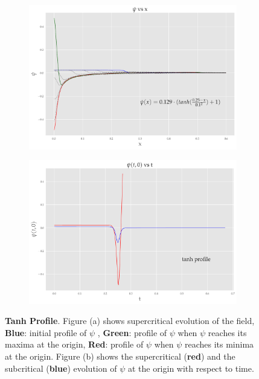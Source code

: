 \begin{figure}
    \centering
    \begin{subfigure}[b]{0.85\textwidth}
        \includegraphics[width=1\linewidth]{images/super_tanh.pdf}
        \caption{}
        \label{fig:tanh}
    \end{subfigure}

    \begin{subfigure}[b]{0.85\textwidth}
        \includegraphics[width=1\linewidth]{images/at0_tanh.pdf}
        \caption{}
        \label{fig:at0_tanh}
    \end{subfigure}
    \caption[Evolution of $\psi$ from an initial tanh profile]{\textbf{Tanh Profile}. Figure (a) shows supercritical evolution of the field, \textbf{Blue}: initial profile of $\psi$ , \textbf{Green}: profile of $\psi$ when $\psi$ reaches its maxima at the origin, \textbf{Red}: profile of $\psi$ when $\psi$ reaches its minima at the origin. Figure (b) shows the supercritical (\textbf{red}) and the subcritical (\textbf{blue}) evolution of $\psi$ at the origin with respect to time.}
\end{figure}

